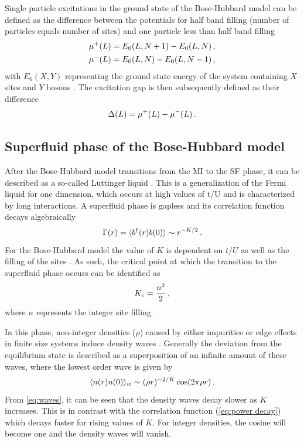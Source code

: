 \documentclass[twoside,twocolumn,9pt]{article}
\begin{document}
Single particle excitations in the ground state of the Bose-Hubbard model can be defined as the difference between the potentials for half band filling (number of particles equals number of sites) and one particle less than half band filling
\begin{align}
  \mu^+(L) &= E_0(L, N+1) - E_0(L, N) \thinspace ,\\
  \mu^-(L) &= E_0(L, N) - E_0(L, N-1) \thinspace ,
\end{align}
with $E_0(X, Y)$ representing the ground state energy of the system containing $X$ sites and $Y$ bosons \cite{ejima2011}. The excitation gap is then subsequently defined as their difference
\begin{equation}
  \Delta(L) = \mu^+(L) - \mu^-(L) \thinspace .
  \label{eq:gap}
\end{equation}

\subsection{Superfluid phase of the Bose-Hubbard model}
After the Bose-Hubbard model transitions from the MI to the SF phase, it can be described as a so-called Luttinger liquid \cite{PhysRevB.46.9325}. This is a generalization of the Fermi liquid for one dimension, which occurs at high values of t/U and is characterized by long interactions. A superfluid phase is gapless and its correlation function decays algebraically
\begin{equation}
    \Gamma(r) = \langle b^\dagger(r)b(0)\rangle \sim r^{-K/2} \thinspace .
    \label{eq:power decay}
\end{equation}
For the Bose-Hubbard model the value of $K$ is dependent on $t/U$ as well as the filling of the sites \cite{schulz1995fermi}. As such, the critical point at which the transition to the superfluid phase occurs can be identified as
\begin{equation}
    K_c = \frac{n^2}{2} \thinspace ,
    \label{eq:Kc}
\end{equation}
where $n$ represents the integer site filling \cite{PhysRevB.46.9325}.

In this phase, non-integer densities ($\rho$) caused by either impurities or edge effects in finite size systems induce density waves \cite{PhysRevLett.47.1840}. Generally the deviation from the equilibrium state is described as a superposition of an infinite amount of these waves, where the lowest order wave is given by 
\begin{equation}
    \langle n(r)n(0) \rangle_w \sim (\rho r)^{-2/K} \cos(2\pi\rho r) \thinspace .
    \label{eq:waves}
\end{equation}
From \cref{eq:waves}, it can be seen that the density waves decay slower as $K$ increases. This is in contrast with the correlation function (\cref{eq:power decay}) which decays faster for rising values of $K$. For integer densities, the cosine will become one and the density waves will vanish.
\end{document}
